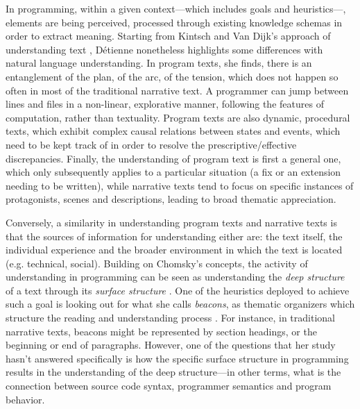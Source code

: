 In programming, within a given context—which includes goals and heuristics—, elements are being perceived, processed through existing knowledge schemas in order to extract meaning. Starting from Kintsch and Van Dijk's approach of understanding text \citep{kintsch_model_1978}, Détienne nonetheless highlights some differences with natural language understanding. In program texts, she finds, there is an entanglement of the plan, of the arc, of the tension, which does not happen so often in most of the traditional narrative text. A programmer can jump between lines and files in a non-linear, explorative manner, following the features of computation, rather than textuality. Program texts are also dynamic, procedural texts, which exhibit complex causal relations between states and events, which need to be kept track of in order to resolve the prescriptive/effective discrepancies. Finally, the understanding of program text is first a general one, which only subsequently applies to a particular situation (a fix or an extension needing to be written), while narrative texts tend to focus on specific instances of protagonists, scenes and descriptions, leading to broad thematic appreciation.

Conversely, a similarity in understanding program texts and narrative texts is that the sources of information for understanding either are: the text itself, the individual experience and the broader environment in which the text is located (e.g. technical, social). Building on Chomsky's concepts, the activity of understanding in programming can be seen as understanding the \emph{deep structure} of a text through its \emph{surface structure} \citep{chomsky_aspects_1965}. One of the heuristics deployed to achieve such a goal is looking out for what she calls \emph{beacons}, as thematic organizers which structure the reading and understanding process \citep{wiedenbeck_initial_1991,koenemann_expert_1991}. For instance, in traditional narrative texts, beacons might be represented by section headings, or the beginning or end of paragraphs. However, one of the questions that her study hasn't answered specifically is how the specific surface structure in programming results in the understanding of the deep structure—in other terms, what is the connection between source code syntax, programmer semantics and program behavior.

